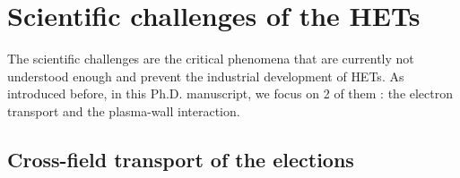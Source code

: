 
\section*{Scientific challenges of the HETs}

The scientific challenges are the critical phenomena that are currently not understood enough and prevent the industrial development of \ac{HET}s.
As introduced before, in this Ph.D. manuscript, we focus on 2 of them : the electron transport and the plasma-wall interaction.

\subsection*{Cross-field transport of the elections}
  \label{sec-mob}
  
